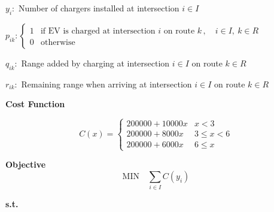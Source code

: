 \documentclass[12pt, fleqn]{article}
\begin{document}
$y_{i}:$ Number of chargers installed at intersection $i \in I$

$p_{ik}: \begin{cases}
        1 & \text{if EV is charged at intersection } i \text{ on route } k \,, \quad i \in I,\ k \in R \\
        0 & \text{otherwise}
    \end{cases}$

$q_{ik}:$ Range added by charging at intersection $i \in I$ on route $k \in R$

$r_{ik}:$ Remaining range when arriving at intersection $i \in I$ on route $k \in R$

\medskip
\textbf{Cost Function}
\smallskip

\begin{equation}
    C(x) = \begin{cases}
        200000 + 10000 x & x < 3        \\
        200000 + 8000 x  & 3 \leq x < 6 \\
        200000 + 6000 x  & 6 \leq x
    \end{cases}
\end{equation}

\textbf{Objective}
\begin{equation}
    \text{MIN} \quad \sum\limits_{i \in I}{C(y_{i})}
\end{equation}

\textbf{s.t.}
\end{document}
